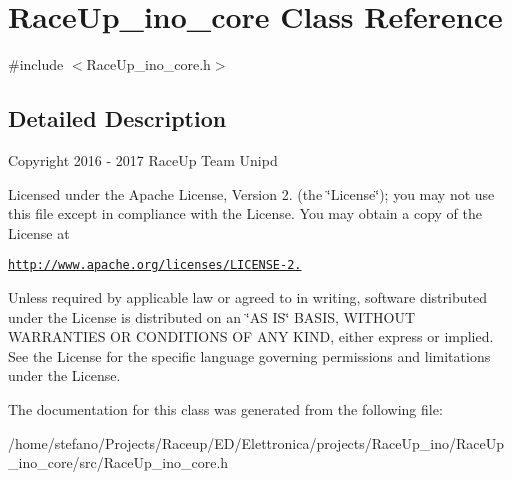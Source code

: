 \hypertarget{class_race_up__ino__core}{}\section{Race\+Up\+\_\+ino\+\_\+core Class Reference}
\label{class_race_up__ino__core}


{\ttfamily \#include $<$Race\+Up\+\_\+ino\+\_\+core.\+h$>$}



\subsection{Detailed Description}
Copyright 2016 -\/ 2017 Race\+Up Team Unipd

Licensed under the Apache License, Version 2. (the \char`\"{}\+License\char`\"{}); you may not use this file except in compliance with the License. You may obtain a copy of the License at

\href{http://www.apache.org/licenses/LICENSE-2.0}{\tt http\+://www.\+apache.\+org/licenses/\+L\+I\+C\+E\+N\+S\+E-\/2.}

Unless required by applicable law or agreed to in writing, software distributed under the License is distributed on an \char`\"{}\+A\+S I\+S\char`\"{} B\+A\+S\+IS, W\+I\+T\+H\+O\+UT W\+A\+R\+R\+A\+N\+T\+I\+ES OR C\+O\+N\+D\+I\+T\+I\+O\+NS OF A\+NY K\+I\+ND, either express or implied. See the License for the specific language governing permissions and limitations under the License. 

The documentation for this class was generated from the following file\+:\begin{DoxyCompactItemize}
\item 
/home/stefano/\+Projects/\+Raceup/\+E\+D/\+Elettronica/projects/\+Race\+Up\+\_\+ino/\+Race\+Up\+\_\+ino\+\_\+core/src/Race\+Up\+\_\+ino\+\_\+core.\+h\end{DoxyCompactItemize}
